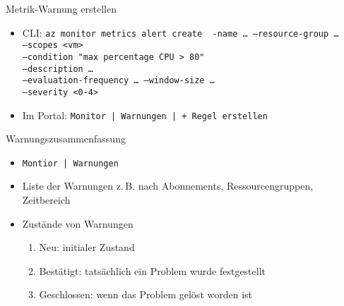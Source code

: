 \begin{flashcard}[Definition]{Metrik-Warnung erstellen}
    \begin{itemize}
        \item CLI:\newline
            \texttt{az monitor metrics alert create \
            -name \ldots\
            --resource-group \ldots\\
            --scopes <vm>\\
            --condition "max percentage CPU > 80"\\
            --description \ldots\\
            --evaluation-frequency \ldots\ --window-size \ldots\\
            --severity <0-4>}
        \item Im Portal:\newline
            \texttt{Monitor | Warnungen | + Regel erstellen}
    \end{itemize}
    \vspace*{\stretch{1}}
\end{flashcard}


\begin{flashcard}[Definition]{Warnungszusammenfassung}
    \begin{itemize}
        \item \texttt{Montior | Warnungen}
        \item Liste der Warnungen z.\,B. nach Abonnements, Ressourcengruppen, Zeitbereich
        \item Zustände von Warnungen
            \begin{enumerate}
                \item Neu: initialer Zustand
                \item Bestätigt: tatsächlich ein Problem wurde festgestellt
                \item Geschlossen: wenn das Problem gelöst worden ist
            \end{enumerate}
    \end{itemize}
\end{flashcard}



